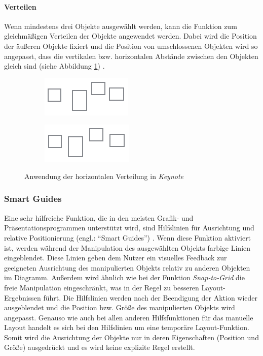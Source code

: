 \paragraph{Verteilen}

Wenn mindestens drei Objekte ausgewählt werden, kann die Funktion zum gleichmäßigen Verteilen der Objekte angewendet werden. Dabei wird die Position der äußeren Objekte fixiert und die Position von umschlossenen Objekten wird so angepasst, dass die vertikalen bzw. horizontalen Abstände zwischen den Objekten gleich sind (siehe Abbildung \ref{fig:keynote-horizontal-distribution}) \cite{11Keynote}.

\begin{figure}[hbt]
    \newcommand{\subfigurewidth}{0.5\textwidth}
    \begin{subfigure}{\subfigurewidth}
        \centering
        \includegraphics{assets/keynote-horizontal-distribution-a}
        \caption{}
    \end{subfigure}
    \begin{subfigure}{\subfigurewidth}
        \centering
        \includegraphics{assets/keynote-horizontal-distribution-b}
        \caption{}
    \end{subfigure}
    \caption{Anwendung der horizontalen Verteilung in \textit{Keynote}}
    \label{fig:keynote-horizontal-distribution}
\end{figure}

\subsubsection{Smart Guides}
\label{subsubsec:smart-guides}

Eine sehr hilfreiche Funktion, die in den meisten Grafik- und Präsentationsprogrammen unterstützt wird, sind Hilfslinien für Ausrichtung und relative Positionierung (engl.: \enquote{Smart Guides}) \cite{11Keynote}. Wenn diese Funktion aktiviert ist, werden während der Manipulation des ausgewählten Objekts farbige Linien eingeblendet. Diese Linien geben dem Nutzer ein visuelles Feedback zur geeigneten Ausrichtung des manipulierten Objekts relativ zu anderen Objekten im Diagramm. Außerdem wird ähnlich wie bei der Funktion \textit{Snap-to-Grid} die freie Manipulation eingeschränkt, was in der Regel zu besseren Layout-Ergebnissen führt. Die Hilfslinien werden nach der Beendigung der Aktion wieder ausgeblendet und die Position bzw. Größe des manipulierten Objekts wird angepasst. Genauso wie auch bei allen anderen Hilfsfunktionen für das manuelle Layout handelt es sich bei den Hilfslinien um eine temporäre Layout-Funktion. Somit wird die Ausrichtung der Objekte nur in deren Eigenschaften (Position und Größe) ausgedrückt und es wird keine explizite Regel erstellt.

